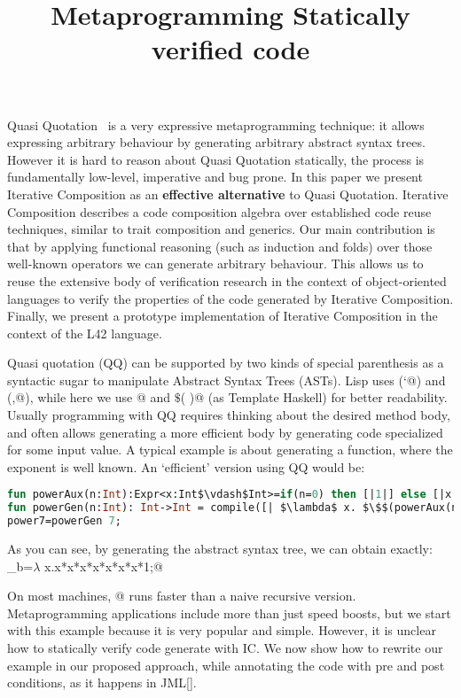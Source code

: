 \documentclass[a4paper,twoside,british,9pt]{extarticle}
\begin{document}
\title{Metaprogramming Statically verified code}
\date{}
\maketitle
\vspace{-10ex}
Quasi Quotation~\cite{moggi1999idealized,pitman1980special,sheard2002template}
is a very expressive metaprogramming technique: it allows expressing arbitrary behaviour by
generating arbitrary abstract syntax trees.
However it is hard to reason about Quasi Quotation statically,
the process is fundamentally low-level, imperative and bug prone.
In this paper we present Iterative Composition as
an \textbf{effective alternative} to Quasi Quotation.
Iterative Composition describes a code composition algebra over established code reuse techniques,
similar to trait composition and generics.
Our main contribution is that by applying functional reasoning (such as induction and folds)
over those well-known operators we can generate arbitrary behaviour.
This allows us to reuse the extensive body of verification research in the 
context of object-oriented languages to verify the properties
of the code generated by Iterative Composition.
Finally, we present a prototype implementation of Iterative Composition in the context of the L42 language.

Quasi quotation (QQ) can be supported by two kinds of special parenthesis as a syntactic sugar to manipulate Abstract Syntax Trees (ASTs).
Lisp uses (\Q@`@) and (\Q@,@), while here we use
\Q@[|  |]@  and \Q@$\$$(  )@ (as Template Haskell) 
for better readability.
Usually programming with QQ requires thinking about the desired method body,
 and often allows generating a more efficient body by generating code specialized for some input value.
A typical example is about generating a \Q@pow@ function, where the exponent is well known.
An `efficient' version using QQ would be:
\begin{lstlisting}[language=ML]
fun powerAux(n:Int):Expr<x:Int$\vdash$Int>=if(n=0) then [|1|] else [|x * $\$$(powerAux(n-1)) |];
fun powerGen(n:Int): Int->Int = compile([| $\lambda$ x. $\$$(powerAux(n)) |]);
power7=powerGen 7;
\end{lstlisting}

\noindent As you can see, by generating the abstract syntax tree, we can obtain exactly:
_b=$\lambda$ x.x*x*x*x*x*x*x*1;@

\noindent On most machines, @ runs faster than a naive recursive version.
Metaprogramming applications include more than just speed boosts, but we start with this example because it is very popular and simple.
However, it is unclear how to statically verify
code generate with IC.
We now show how to rewrite our \Q@pow@ example
in our proposed approach, while annotating the code with pre and post conditions, as it happens in JML[].
\newcommand\thisExp{\ensuremath{{}^{\textbf{this.exp()}}}}
\newcommand\thisSuperExp{\ensuremath{{}^{\textbf{this.superExp()}}}}
\newcommand\oneThisSuperExp{\ensuremath{{}^{\textbf{1+this.superExp()}}}}
\newcommand\powerY{\ensuremath{{}^{\textbf{y}}}}
\end{document}

